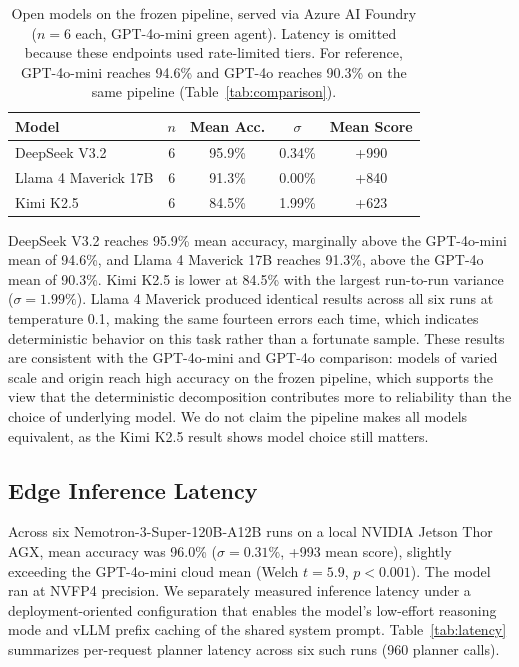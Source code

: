 \documentclass{article}
\begin{document}
\begin{table}[ht]
\centering
\small
\begin{tabular}{@{}lcccc@{}}
\toprule
\textbf{Model} & $n$ & \textbf{Mean Acc.} & $\sigma$ & \textbf{Mean Score} \\
\midrule
DeepSeek V3.2        & 6 & 95.9\% & 0.34\% & +990 \\
Llama 4 Maverick 17B & 6 & 91.3\% & 0.00\% & +840 \\
Kimi K2.5            & 6 & 84.5\% & 1.99\% & +623 \\
\bottomrule
\end{tabular}
\caption{Open models on the frozen pipeline, served via Azure AI Foundry
($n = 6$ each, GPT-4o-mini green agent). Latency is omitted because these
endpoints used rate-limited tiers. For reference, GPT-4o-mini reaches
94.6\% and GPT-4o reaches 90.3\% on the same pipeline
(Table~\ref{tab:comparison}).}
\label{tab:openmodels}
\end{table}

DeepSeek V3.2 reaches 95.9\% mean accuracy, marginally above the
GPT-4o-mini mean of 94.6\%, and Llama 4 Maverick 17B reaches 91.3\%, above
the GPT-4o mean of 90.3\%. Kimi K2.5 is lower at 84.5\% with the largest
run-to-run variance ($\sigma = 1.99\%$). Llama 4 Maverick produced
identical results across all six runs at temperature 0.1, making the same
fourteen errors each time, which indicates deterministic behavior on this
task rather than a fortunate sample. These results are consistent with the
GPT-4o-mini and GPT-4o comparison: models of varied scale and origin reach
high accuracy on the frozen pipeline, which supports the view that the
deterministic decomposition contributes more to reliability than the
choice of underlying model. We do not claim the pipeline makes all models
equivalent, as the Kimi K2.5 result shows model choice still matters.

\subsection{Edge Inference Latency}

Across six Nemotron-3-Super-120B-A12B runs on a local NVIDIA Jetson Thor
AGX, mean accuracy was 96.0\% ($\sigma = 0.31\%$, +993 mean score),
slightly exceeding the GPT-4o-mini cloud mean
(Welch $t = 5.9$, $p < 0.001$). The model ran at NVFP4 precision. We
separately measured inference latency under a deployment-oriented
configuration that enables the model's low-effort reasoning mode and vLLM
prefix caching of the shared system prompt. Table~\ref{tab:latency}
summarizes per-request planner latency across six such runs (960 planner
calls).
\end{document}

